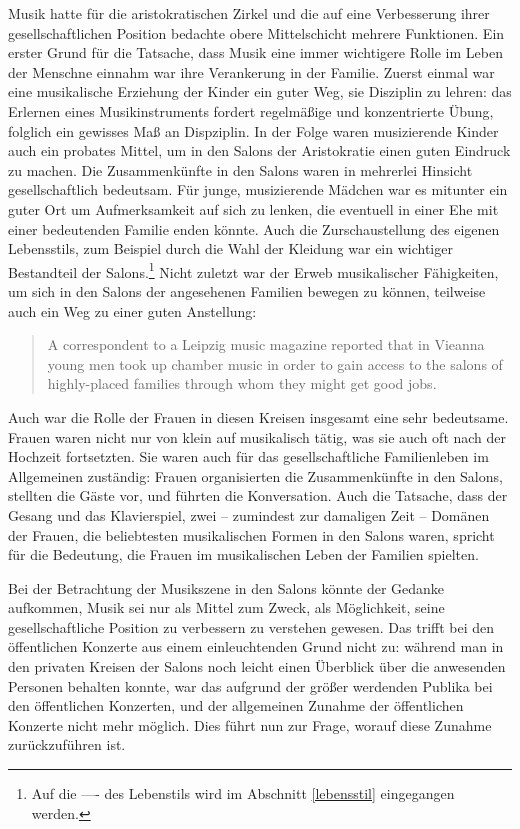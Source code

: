 \documentclass[a4paper, german, oneside]{scrbook}
\begin{document}
Musik hatte für die aristokratischen Zirkel und die auf eine Verbesserung ihrer gesellschaftlichen Position bedachte obere Mittelschicht mehrere Funktionen. Ein erster Grund für die Tatsache, dass Musik eine immer wichtigere Rolle im Leben der Menschne einnahm war ihre Verankerung in der Familie. Zuerst einmal war eine musikalische Erziehung der Kinder ein guter Weg, sie Disziplin zu lehren: das Erlernen eines Musikinstruments fordert regelmäßige und konzentrierte Übung, folglich ein gewisses Maß an Dispziplin. \parencite[35ff.]{weber_music_2004} In der Folge waren musizierende Kinder auch ein probates Mittel, um in den Salons der Aristokratie einen guten Eindruck zu machen. Die Zusammenkünfte in den Salons waren in mehrerlei Hinsicht gesellschaftlich bedeutsam. Für junge, musizierende Mädchen war es mitunter ein guter Ort um Aufmerksamkeit auf sich zu lenken, die eventuell in einer Ehe mit einer bedeutenden Familie enden könnte. Auch die Zurschaustellung des eigenen Lebensstils, zum Beispiel durch die Wahl der Kleidung war ein wichtiger Bestandteil der Salons.\footnote{Auf die ---- des Lebenstils wird im Abschnitt \ref{lebensstil} eingegangen werden.} Nicht zuletzt war der Erweb musikalischer Fähigkeiten, um sich in den Salons der angesehenen Familien bewegen zu können, teilweise auch ein Weg zu einer guten Anstellung: \blockquote[{\cite[37]{weber_music_2004}}]{A correspondent to a Leipzig music magazine reported that in Vieanna young men took up chamber music in order to gain access to the salons of highly-placed families through whom they might get good jobs.}

Auch war die Rolle der Frauen in diesen Kreisen insgesamt eine sehr bedeutsame. Frauen waren nicht nur von klein auf musikalisch tätig, was sie auch oft nach der Hochzeit fortsetzten. Sie waren auch für das gesellschaftliche Familienleben im Allgemeinen zuständig: Frauen organisierten die Zusammenkünfte in den Salons, stellten die Gäste vor, und führten die Konversation. Auch die Tatsache, dass der Gesang und das Klavierspiel, zwei -- zumindest zur damaligen Zeit -- Domänen der Frauen, die beliebtesten musikalischen Formen in den Salons waren, spricht für die Bedeutung, die Frauen im musikalischen Leben der Familien spielten. \parencite[vgl.][41]{weber_music_2004}

Bei der Betrachtung der Musikszene in den Salons könnte der Gedanke aufkommen, Musik sei nur als Mittel zum Zweck, als Möglichkeit, seine gesellschaftliche Position zu verbessern zu verstehen gewesen. Das trifft bei den öffentlichen Konzerte aus einem einleuchtenden Grund nicht zu: während man in den privaten Kreisen der Salons noch leicht einen Überblick über die anwesenden Personen behalten konnte, war das aufgrund der größer werdenden Publika bei den öffentlichen Konzerten, und der allgemeinen Zunahme der öffentlichen Konzerte nicht mehr möglich. \parencite[vgl.][37]{weber_music_2004} Dies führt nun zur Frage, worauf diese Zunahme zurückzuführen ist. 
\end{document}
